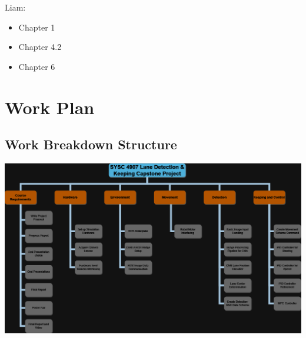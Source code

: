\documentclass[titlepage]{article}
\begin{document}
Liam:
\begin{itemize}
	\item Chapter 1
	\item Chapter 4.2
	\item Chapter 6
\end{itemize}

\section{Work Plan}
\subsection{Work Breakdown Structure}
\includegraphics[width=10in,scale=1, angle=90, origin=c]{wbs.png}
\end{document}
